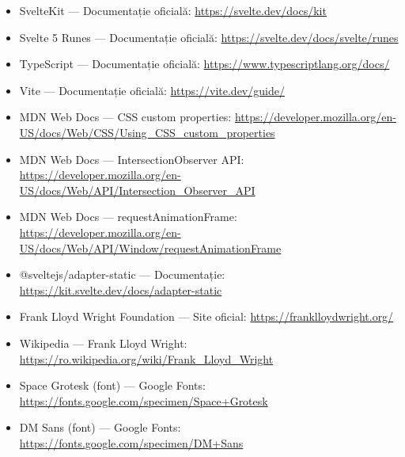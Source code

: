 \documentclass[12pt,a4paper]{report}
\begin{document}
\begin{itemize}[label=\textbullet]
  \item SvelteKit --- Documentație oficială: \url{https://svelte.dev/docs/kit}
  \item Svelte 5 Runes --- Documentație oficială: \url{https://svelte.dev/docs/svelte/runes}
  \item TypeScript --- Documentație oficială: \url{https://www.typescriptlang.org/docs/}
  \item Vite --- Documentație oficială: \url{https://vite.dev/guide/}
  \item MDN Web Docs --- CSS custom properties: \url{https://developer.mozilla.org/en-US/docs/Web/CSS/Using_CSS_custom_properties}
  \item MDN Web Docs --- IntersectionObserver API: \url{https://developer.mozilla.org/en-US/docs/Web/API/Intersection_Observer_API}
  \item MDN Web Docs --- requestAnimationFrame: \url{https://developer.mozilla.org/en-US/docs/Web/API/Window/requestAnimationFrame}
  \item @sveltejs/adapter-static --- Documentație: \url{https://kit.svelte.dev/docs/adapter-static}
  \item Frank Lloyd Wright Foundation --- Site oficial: \url{https://franklloydwright.org/}
  \item Wikipedia --- Frank Lloyd Wright: \url{https://ro.wikipedia.org/wiki/Frank_Lloyd_Wright}
  \item Space Grotesk (font) --- Google Fonts: \url{https://fonts.google.com/specimen/Space+Grotesk}
  \item DM Sans (font) --- Google Fonts: \url{https://fonts.google.com/specimen/DM+Sans}
\end{itemize}
\end{document}
